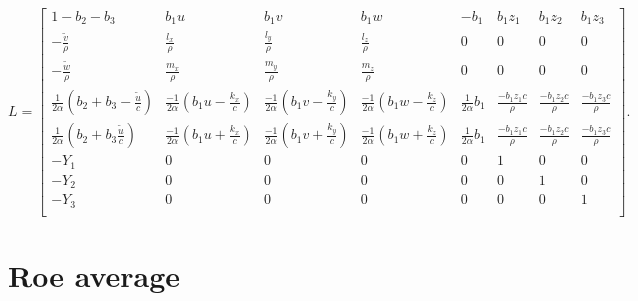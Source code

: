 \[ \begin{equation*} L= \begin{bmatrix} 1-b_2-b_3 & b_1 u & b_1 v & b_1 w & -b_1 & b_1z_1 & b_1 z_2 & b_1 z_3\\ -\frac{\tilde{v}}{\rho} & \frac{l_x}{\rho}& \frac{l_y}{\rho}& \frac{l_z}{\rho} & 0 & 0 & 0 & 0\\ -\frac{\tilde{w}}{\rho} & \frac{m_x}{\rho}& \frac{m_y}{\rho}& \frac{m_z}{\rho} & 0 & 0 & 0 & 0\\ \frac{1}{2\alpha}\left(b_2+b_3-\frac{\tilde{u}}{c}\right)& \frac{-1}{2\alpha}\left(b_1u-\frac{k_x}{c}\right)& \frac{-1}{2\alpha}\left(b_1v-\frac{k_y}{c}\right) & \frac{-1}{2\alpha}\left(b_1w-\frac{k_z}{c}\right) & \frac{1}{2\alpha}b_1 & \frac{-b_1z_1c}{\rho} & \frac{-b_1z_2c}{\rho} & \frac{-b_1z_3c}{\rho}\\ \frac{1}{2\alpha}\left(b_2+b_3\frac{\tilde{u}}{c}\right)& \frac{-1}{2\alpha}\left(b_1u+\frac{k_x}{c}\right)& \frac{-1}{2\alpha}\left(b_1v+\frac{k_y}{c}\right) & \frac{-1}{2\alpha}\left(b_1w+\frac{k_z}{c}\right) & \frac{1}{2\alpha}b_1 & \frac{-b_1z_1c}{\rho} & \frac{-b_1z_2c}{\rho} & \frac{-b_1z_3c}{\rho}\\ -Y_1 & 0 & 0 & 0 & 0 & 1 & 0 & 0\\ -Y_2 & 0 & 0 & 0 & 0 & 0 & 1 & 0\\ -Y_3 & 0 & 0 & 0 & 0 & 0 & 0 & 1\\ \end{bmatrix}. \end{equation*} \]\hypertarget{weno_Roeaverage}{}\section{Roe average}\label{weno_Roeaverage}
